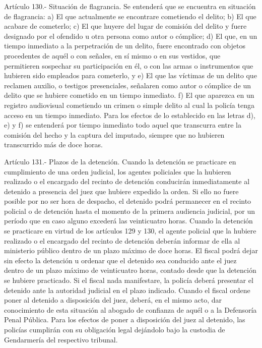     Artículo 130.- Situación de flagrancia. Se entenderá que se encuentra en situación de flagrancia:
    a) El que actualmente se encontrare cometiendo el delito;
    b) El que acabare de cometerlo;
    c) El que huyere del lugar de comisión del delito y fuere designado por el ofendido u otra persona como autor o cómplice;
    d) El que, en un tiempo inmediato a la perpetración de un delito, fuere encontrado con objetos procedentes de aquél o con señales, en sí mismo o en sus vestidos, que permitieren sospechar su participación en él, o con las armas o instrumentos que hubieren sido empleados para cometerlo, y
    e) El que las víctimas de un delito que reclamen auxilio, o testigos presenciales, señalaren como autor o cómplice de un delito que se hubiere cometido en un tiempo inmediato.
    f) El que aparezca en un registro audiovisual cometiendo un crimen o simple delito al cual la policía tenga acceso en un tiempo inmediato.
    Para los efectos de lo establecido en las letras d), e) y f) se entenderá por tiempo inmediato todo aquel que transcurra entre la comisión del hecho y la captura del imputado, siempre que no hubieren transcurrido más de doce horas.




    Artículo 131.- Plazos de la detención. Cuando la detención se practicare en cumplimiento de una orden judicial, los agentes policiales que la hubieren realizado o el encargado del recinto de detención conducirán inmediatamente al detenido a presencia del juez que hubiere expedido la orden. Si ello no fuere posible por no ser hora de despacho, el detenido podrá permanecer en el recinto policial o de detención hasta el momento de la primera audiencia judicial, por un período que en caso alguno excederá las veinticuatro horas.
    Cuando la detención se practicare en virtud de los artículos 129 y 130, el agente policial que la hubiere realizado o el encargado del recinto de detención deberán informar de ella al ministerio público dentro de un plazo máximo de doce horas. El fiscal podrá dejar sin efecto la detención u ordenar que el detenido sea conducido ante el juez dentro de un plazo máximo de veinticuatro horas, contado desde que la detención se hubiere practicado. Si el fiscal nada manifestare, la policía deberá presentar el detenido ante la autoridad judicial en el plazo indicado.
    Cuando el fiscal ordene poner al detenido a disposición del juez, deberá, en el mismo acto, dar conocimiento de esta situación al abogado de confianza de aquél o a la Defensoría Penal Pública.
    Para los efectos de poner a disposición del juez al detenido, las policías cumplirán con su obligación legal dejándolo bajo la custodia de Gendarmería del respectivo tribunal.

